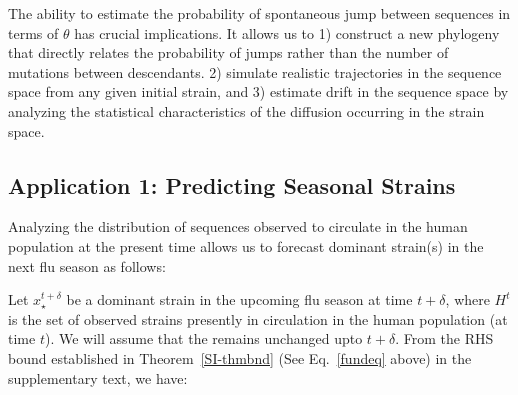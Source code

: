 {The ability to estimate the probability of spontaneous jump between sequences in terms of $\theta$ has  crucial implications. It allows us to 1) construct  a new  phylogeny that directly relates the probability of jumps rather than the number of mutations  between descendants. 2) simulate realistic trajectories in the sequence space from any given initial strain, and 3) estimate drift in the sequence space  by analyzing the statistical characteristics of the diffusion occurring in the strain space.





\subsection*{Application 1: Predicting Seasonal Strains}

Analyzing the distribution of sequences observed to circulate in the human population at the present time allows us to forecast dominant strain(s) in the next flu season as follows:




\def\E{\mathcal{E}}
\def\dst{x_\star^{t+\delta}}
\def\dsta{x^{t+\delta}}

Let $\dst$ be a dominant strain in the upcoming flu season at time $t+\delta$,
where $H^t$ is the set of observed strains presently in circulation in the human population (at time $t$). We will assume that the \enet  remains unchanged upto $t+\delta$.
From the RHS bound established in Theorem~\ref{SI-thmbnd} (See Eq.~\eqref{fundeq} above) in the supplementary text, we have:

}
